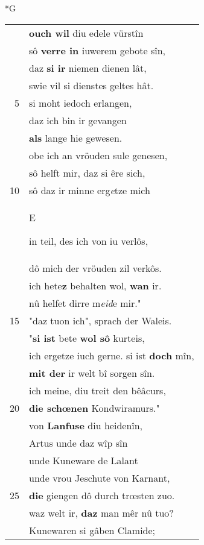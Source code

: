 \documentclass[8pt,a4paper,notitlepage]{article}
\begin{document}
\newpage
\begin{table}[ht]
\begin{minipage}[t]{0.5\linewidth}
\small
\begin{center}*G
\end{center}
\begin{tabular}{rl}
 & \textbf{ouch wil} diu edele vürstîn\\ 
 & sô \textbf{verre in} iuwerem gebote sîn,\\ 
 & daz \textbf{si ir} niemen dienen lât,\\ 
 & swie vil si dienstes geltes hât.\\ 
5 & si moht iedoch erlangen,\\ 
 & daz ich bin ir gevangen\\ 
 & \textbf{als} lange hie gewesen.\\ 
 & obe ich an vröuden sule genesen,\\ 
 & sô helft mir, daz si êre sich,\\ 
10 & sô daz ir minne erg\textit{e}tze mich\\ 
 & \begin{large}E\end{large}in teil, des ich von iu verlôs,\\ 
 & dô mich der vröuden zil verkôs.\\ 
 & ich hete\textbf{z} behalten wol, \textbf{wan} ir.\\ 
 & nû helfet dirre m\textit{eid}e mir."\\ 
15 & "daz tuon ich", sprach der Waleis.\\ 
 & "\textbf{si ist} bete \textbf{wol sô} kurteis,\\ 
 & ich ergetze iuch gerne. si ist \textbf{doch} mîn,\\ 
 & \textbf{mit der} ir welt bî sorgen sîn.\\ 
 & ich meine, diu treit den bêâcurs,\\ 
20 & \textbf{die schœnen} Kondwiramurs."\\ 
 & von \textbf{Lanfuse} diu heidenîn,\\ 
 & Artus unde daz wîp sîn\\ 
 & unde Kuneware de Lalant\\ 
 & unde vrou Jeschute von Karnant,\\ 
25 & \textbf{die} giengen dô durch trœsten zuo.\\ 
 & waz welt ir, \textbf{daz} man mêr nû tuo?\\ 
 & Kunewaren si gâben Clamide;\\ 

\end{tabular}
\end{minipage}
\end{table}
\end{document}
